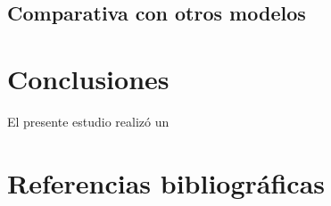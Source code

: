 \documentclass[
  11pt,
  letterpaper,
]{article}
\begin{document}
\hypertarget{comparativa-con-otros-modelos}{%
\subsection{Comparativa con otros modelos}\label{comparativa-con-otros-modelos}}

\hypertarget{conclusiones}{%
\section{Conclusiones}\label{conclusiones}}

El presente estudio realizó un

\hypertarget{referencias-bibliogruxe1ficas}{%
\section{Referencias bibliográficas}\label{referencias-bibliogruxe1ficas}}
\end{document}
